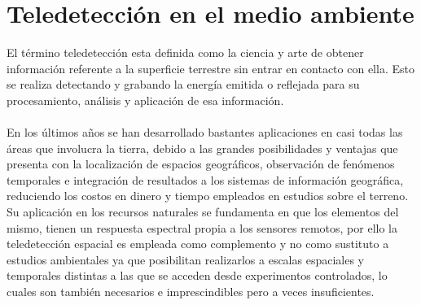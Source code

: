 \section{Teledetecci\'on en el medio ambiente}
El t\'ermino teledetecci\'on esta definida como la ciencia y arte de obtener informaci\'on referente a la superficie terrestre sin entrar en contacto con ella. Esto se realiza detectando y grabando la energía emitida o reflejada para su procesamiento, an\'alisis y aplicaci\'on de esa información\cite{salinero2002teledeteccion}.\\~\\
En los \'ultimos a\~{n}os se han desarrollado bastantes aplicaciones en casi todas las \'areas que involucra la tierra, debido a las grandes posibilidades y ventajas que presenta con la localizaci\'on de espacios geogr\'aficos, observaci\'on de fen\'omenos temporales e integraci\'on de resultados a los sistemas de informaci\'on geogr\'afica, reduciendo los costos en dinero y tiempo empleados en estudios sobre el terreno\cite{baker2006mapping}. Su aplicaci\'on en los recursos naturales se fundamenta en que los elementos del mismo, tienen un respuesta espectral propia a los sensores remotos, por ello la teledetecci\'on espacial es empleada como complemento y no como sustituto a estudios ambientales ya que posibilitan realizarlos a escalas espaciales y temporales distintas a las que se acceden desde experimentos controlados, lo cuales son tambi\'en necesarios e imprescindibles pero a veces insuficientes\cite{perez2011aplicaciones}.



